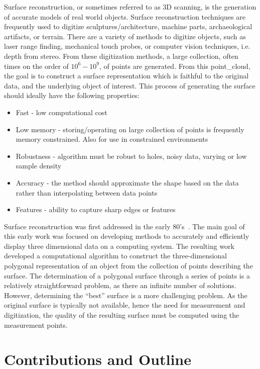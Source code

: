 Surface reconstruction, or sometimes referred to as 3D scanning, is the generation of accurate models of real world objects.
Surface reconstruction techniques are frequently used to digitize sculptures/architecture, machine parts, archaeological artifacts, or terrain.
There are a variety of methods to digitize objects, such as laser range finding, mechanical touch probes, or computer vision techniques, i.e. depth from stereo.
From these digitization methods, a large collection, often times on the order of \( 10^6 - 10^9\), of points are generated.
From this \gls{point_cloud}, the goal is to construct a surface representation which is faithful to the original data, and the underlying object of interest.
This process of generating the surface should ideally have the following properties:
\begin{itemize}
    \item Fast - low computational cost
    \item Low memory - storing/operating on large collection of points is frequently memory constrained. Also for use in constrained environments
    \item Robustness - algorithm must be robust to holes, noisy data, varying or low sample density
    \item Accuracy - the method should approximate the shape based on the data rather than interpolating between data points
    \item Features - ability to capture sharp edges or features
\end{itemize}

Surface reconstruction was first addressed in the early 80's~\cite{uselton1983,uselton1981}.
The main goal of this early work was focused on developing methods to accurately and efficiently display three dimensional data on a computing system.
The resulting work developed a computational algorithm to construct the three-dimensional polygonal representation of an object from the collection of points describing the surface.
The determination of a polygonal surface through a series of points is a relatively straightforward problem, as there an infinite number of solutions.
However, determining the ``best'' surface is a more challenging problem.
As the original surface is typically not available, hence the need for measurement and digitization, the quality of the resulting surface must be computed using the measurement points.

\section{Contributions and Outline}

